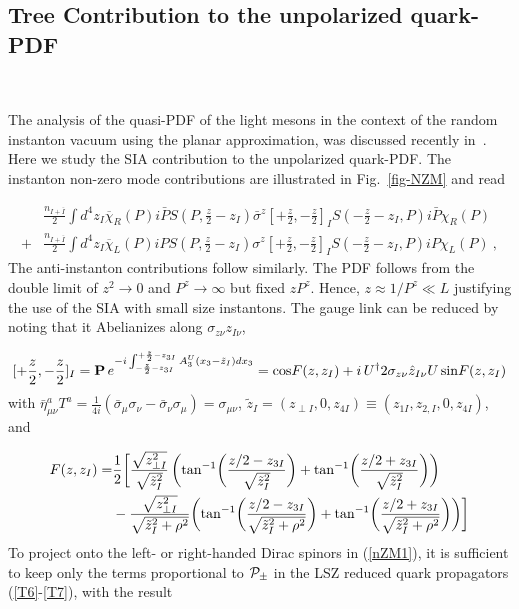 \documentclass[11pt,aps,amsmath,amssymb,nofootinbib,notitlepage,longbibliography]{revtex4-1}
\newcommand{\be}{\begin{equation}}
\newcommand{\ee}{\end{equation}}
\begin{document}
\subsection{Tree Contribution to the unpolarized quark-PDF}~\label{unpolarized}

The analysis of the quasi-PDF of the light mesons in the context of the random instanton vacuum using
the planar approximation,  was discussed recently in~\cite{Kock:2020frx}.
Here  we study the SIA contribution to the unpolarized quark-PDF. The
instanton  non-zero mode contributions are illustrated in Fig.~\ref{fig-NZM} and read


\begin{align}\label{nZM1}
&\frac{n_{I+\bar I}}{2}\int d^4z_{I} \overline \chi_R(P)i\bar P{S}(P,\frac{z}{2}-z_I)\bar \sigma^z[+\frac{z}{2},-\frac{z}{2}]_I{S}(-\frac{z}{2}-z_I,P)i\bar P\chi_R(P)\nonumber \\
+&\frac{n_{I+\bar I}}{2}\int d^4z_{I}\overline\chi_L(P)i P{S}(P,\frac{z}{2}-z_I)\sigma^z
[+\frac{z}{2},-\frac{z}{2}]_{I}{S}(-\frac{z}{2}-z_I,P)i P\chi_L(P) \ ,
\end{align}
The anti-instanton contributions follow similarly.
The PDF follows from the double limit of
$z^2\rightarrow 0$ and $P^z\rightarrow\infty$ but fixed $zP^z$.  Hence, $z\approx 1/P^z\ll L$
justifying the use of the SIA  with  small size instantons.
The gauge link  can be reduced by noting that it Abelianizes along $\sigma_{z\nu}z_{I\nu}$,

\be
\label{U1}
[+\frac z2, -\frac z2]_I={\bf P}\,e^{-i\int_{-\frac z2-z_{3I}}^{+\frac z2-z_{3I}}A^U_3(x_3-\tilde z_I)dx_3}
={\rm cos}F(z, z_I)+i\,U^\dagger 2\sigma_{z\nu}\hat z_{I\nu}U\,{\rm sin}F(z, z_I)
\ee
with  $\bar \eta^a_{\mu\nu}T^a=\frac 1{4i}(\bar \sigma_\mu\sigma_\nu-\bar\sigma_\nu\sigma_\mu)=\sigma_{\mu\nu}$,
$\tilde z_I= (z_{\perp I},0,z_{4I})\equiv (z_{1I}, z_{2,I}, 0,z_{4I})$, and


\begin{align}
\label{U2}
F(z,z_I)=&\frac 12\bigg[\frac {\sqrt{ z^2_{\perp I}}}{\sqrt{\tilde z_{I}^2}}\,\bigg(
{\rm tan}^{-1}\bigg(\frac {z/2-z_{3I}}{\sqrt{\tilde z_{I}^2}}\bigg)+{\rm tan}^{-1}\bigg(\frac {z/2+z_{3I}}{\sqrt{\tilde z_{I}^2}}\bigg)\bigg)\nonumber\\
&-
\frac {\sqrt{z^2_{\perp I}}}{\sqrt{\tilde z_{I}^2+\rho^2}}\bigg(
{\rm tan}^{-1}\bigg(\frac {z/2-z_{3I}}{\sqrt{\tilde z_{ I}^2+\rho^2}}\bigg)+{\rm tan}^{-1}\bigg(\frac {z/2+z_{3I}}{\sqrt{\tilde z_{ I}^2+\rho^2}}\bigg)\bigg)
\bigg]
\end{align}
To project onto the left- or right-handed Dirac spinors in (\ref{nZM1}), it is sufficient to keep only the terms proportional to ${\cal P}_{\pm}$
 in the LSZ reduced quark propagators (\ref{T6}-\ref{T7}), with the result
\end{document}
